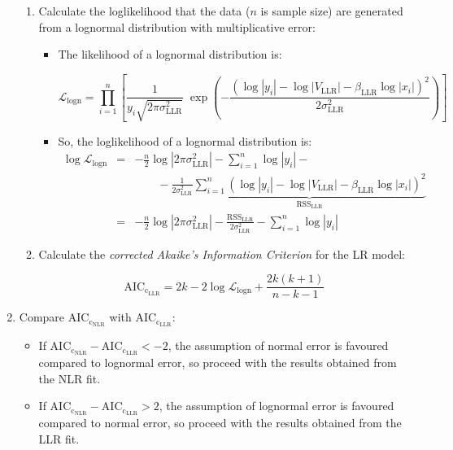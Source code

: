\begin{enumerate}
\begin{enumerate}
        \item Calculate the loglikelihood that the data ($n$ is sample size) are generated from a lognormal distribution with multiplicative error:
        \begin{itemize}
            \item The likelihood of a lognormal distribution is: 
            \begin{linenomath}
            $$\mathcal{L}_\text{logn} = \prod_{i=1}^n\left[\frac{1}{y_i\sqrt{2\pi\sigma^2_\text{LLR}}}\;\exp{\left(-\frac{\left(\log|y_i|-\log|V_\text{LLR}|-\beta_\text{LLR}\log|x_i|\right)^2}{2\sigma^2_\text{LLR}}\right)}\right]$$
            \end{linenomath}
            \item So, the loglikelihood of a lognormal distribution is: 
            \begin{eqnarray*}
                \log\mathcal{L}_\text{logn} &=& -\frac{n}{2}\log\left|2\pi\sigma^2_\text{LLR}\right| - \sum_{i=1}^n\log|y_i| -\\
                &&\qquad-\frac{1}{2\sigma^2_\text{LLR}}\underbrace{\sum_{i=1}^n\left(\log|y_i|-\log|V_\text{LLR}|-\beta_\text{LLR}\log|x_i|\right)^2}_{\mathrm{RSS
                }_\text{LLR}}\\
                &=& -\frac{n}{2}\log\left|2\pi\sigma^2_\text{LLR}\right| - \frac{\mathrm{RSS}_\text{LLR}}{2\sigma^2_\text{LLR}} - \sum_{i=1}^n\log|y_i|
            \end{eqnarray*}
        \end{itemize}
        \item Calculate the \emph{corrected Akaike's Information Criterion} for the LR model: 
        	\begin{linenomath}
        	$$\mathrm{AIC_{c_{LLR}}} = 2k - 2\log\mathcal{L}_\text{logn} + \frac{2k(k+1)}{n-k-1}$$
			\end{linenomath}
    \end{enumerate}
    \item Compare $\mathrm{AIC_{c_{NLR}}}$ with $\mathrm{AIC_{c_{LLR}}}$:
    \begin{itemize}
        \item If $\mathrm{AIC_{c_{NLR}}} - \mathrm{AIC_{c_{LLR}}} < -2$, the assumption of normal error is favoured compared to lognormal error, so proceed with the results obtained from the NLR fit.
        \item If $\mathrm{AIC_{c_{NLR}}} - \mathrm{AIC_{c_{LLR}}} > 2$, the assumption of lognormal error is favoured compared to normal error, so proceed with the results obtained from the LLR fit.

\end{itemize}
\end{enumerate}
